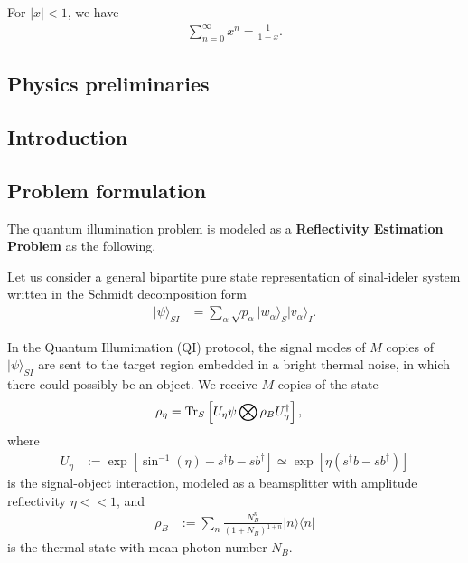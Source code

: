 \documentclass[../../note.tex]{subfiles}
\begin{document}
\begin{lemma}
    For $\vert x \vert < 1$, we have
    \begin{align}
        \sum_{n=0}^{\infty} x^n = \frac{1}{1 - x}.
    \end{align}
\end{lemma}

\begin{lemma}
    
\end{lemma}


\subsection{Physics preliminaries}


\subsection{Introduction}


\subsection{Problem formulation}
The quantum illumination problem is modeled as a \textbf{Reflectivity Estimation Problem} as the following.

Let us consider a general bipartite pure state representation of sinal-ideler system written in the Schmidt decomposition form
\begin{align}
    \vert \psi \rangle_{SI}
    &= \sum_{\alpha} \sqrt{p_{\alpha}} \vert w_{\alpha} \rangle_S \vert v_{\alpha} \rangle_I.
\end{align}

In the Quantum Illumimation (QI) protocol, the signal modes of $M$ copies of $\vert \psi \rangle_{SI}$ are sent to the target region embedded in a bright thermal noise, in which there could possibly be an object. We receive $M$ copies of the state
\begin{align}
    \rho_{\eta}
    &= \operatorname{Tr}_S\left[U_{\eta} \psi \bigotimes \rho_B U_{\eta}^{\dagger}\right],
\end{align}
where 
\begin{align}
    U_{\eta}
    &:= \exp[\sin^{-1}(\eta) - s^\dagger b - s b^\dagger] \simeq \exp[\eta(s^\dagger b - s b^\dagger)]
    \label{def:U_eta}
\end{align}
is the signal-object interaction, modeled as a beamsplitter with amplitude reflectivity $\eta << 1$, and 
\begin{align}
\label{def: rho_B}
    \rho_B
    &:= \sum_n \frac{N_B^n}{(1+N_B)^{1+n}} \vert n \rangle \langle n \vert
\end{align} 
is the thermal state with mean photon number $N_B$.
\end{document}

